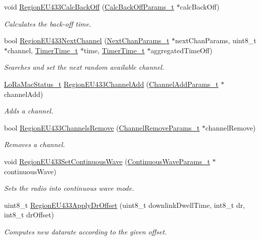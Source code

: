 \begin{DoxyCompactItemize}
void \hyperlink{group__REGIONEU433_ga3e31558e030a1a2c27c26b8057c805e6}{Region\+E\+U433\+Calc\+Back\+Off} (\hyperlink{group__REGION_ga7c5c9a8da174e6679eded8257dc92fd9}{Calc\+Back\+Off\+Params\+\_\+t} $\ast$calc\+Back\+Off)
\begin{DoxyCompactList}\small\item\em Calculates the back-\/off time. \end{DoxyCompactList}\item 
bool \hyperlink{group__REGIONEU433_gacece995005d92767951d5e1b4d513494}{Region\+E\+U433\+Next\+Channel} (\hyperlink{group__REGION_ga115f5e83afae352c0a3dcdc193374040}{Next\+Chan\+Params\+\_\+t} $\ast$next\+Chan\+Params, uint8\+\_\+t $\ast$channel, \hyperlink{utilities_8h_a4215ca43d3e953099ea758ce428599d0}{Timer\+Time\+\_\+t} $\ast$time, \hyperlink{utilities_8h_a4215ca43d3e953099ea758ce428599d0}{Timer\+Time\+\_\+t} $\ast$aggregated\+Time\+Off)
\begin{DoxyCompactList}\small\item\em Searches and set the next random available channel. \end{DoxyCompactList}\item 
\hyperlink{group__LORAMAC_ga30bd25657e10480f8605ee951b0ecfbd}{Lo\+Ra\+Mac\+Status\+\_\+t} \hyperlink{group__REGIONEU433_ga477a869bd33f0fc4a1104e1a2097418a}{Region\+E\+U433\+Channel\+Add} (\hyperlink{group__REGION_gab1c5f3aa06614283202906cef4417860}{Channel\+Add\+Params\+\_\+t} $\ast$channel\+Add)
\begin{DoxyCompactList}\small\item\em Adds a channel. \end{DoxyCompactList}\item 
bool \hyperlink{group__REGIONEU433_ga8c6f83d1c3aadcbc717551c3d4bc912e}{Region\+E\+U433\+Channels\+Remove} (\hyperlink{group__REGION_gaa37468560d2fc81a977b57a48e5d72c0}{Channel\+Remove\+Params\+\_\+t} $\ast$channel\+Remove)
\begin{DoxyCompactList}\small\item\em Removes a channel. \end{DoxyCompactList}\item 
void \hyperlink{group__REGIONEU433_ga76561de6c45317a54ded972f7ac80836}{Region\+E\+U433\+Set\+Continuous\+Wave} (\hyperlink{group__REGION_gaf39bb5ba06921139c6d17f88a8d518cd}{Continuous\+Wave\+Params\+\_\+t} $\ast$continuous\+Wave)
\begin{DoxyCompactList}\small\item\em Sets the radio into continuous wave mode. \end{DoxyCompactList}\item 
uint8\+\_\+t \hyperlink{group__REGIONEU433_ga1d0c43ec9e4539732c33e625f56104b2}{Region\+E\+U433\+Apply\+Dr\+Offset} (uint8\+\_\+t downlink\+Dwell\+Time, int8\+\_\+t dr, int8\+\_\+t dr\+Offset)
\begin{DoxyCompactList}\small\item\em Computes new datarate according to the given offset. \end{DoxyCompactList}\end{DoxyCompactItemize}


